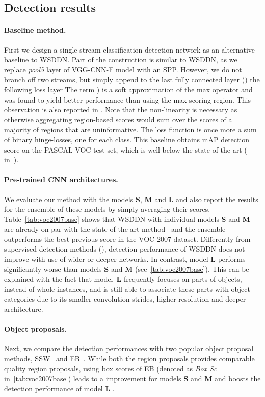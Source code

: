 \documentclass[10pt,twocolumn,letterpaper]{article}
\begin{document}
\subsection{Detection results}\label{s:detres}


\paragraph{Baseline method.} First we design a single stream classification-detection network as an alternative baseline to WSDDN. Part of the construction is similar to WSDDN, as we replace \textit{pool5} layer of VGG-CNN-F model with an SPP. However, we do not branch off two streams, but simply append to the last fully connected layer () the following loss layer 
The term ) is a soft approximation of the max operator  and was found to yield better performance than using the max scoring region. This observation is also reported in \cite{Bilen14}. Note that the non-linearity is necessary as otherwise aggregating region-based scores would sum over the scores of a majority of regions that are uninformative. The loss function is once more a sum of  binary hinge-losses, one for each class. This baseline obtains  mAP detection score on the PASCAL VOC test set, which is well below the state-of-the-art ( in~\cite{Wang14a}).

\paragraph{Pre-trained CNN architectures.} We evaluate our method with the models \textbf{S}, \textbf{M} and \textbf{L} and also report the results for the ensemble of these models by simply averaging their scores. Table~\ref{tab:voc2007base} shows that WSDDN with individual models \textbf{S} and \textbf{M} are already on par with the state-of-the-art method~\cite{Wang14a} and the ensemble outperforms the best previous score in the VOC 2007 dataset. Differently from supervised detection methods (\eg \cite{Girshick15}), detection performance of WSDDN does not improve with use of wider or deeper networks. In contrast, model \textbf{L} performs significantly worse than models \textbf{S} and \textbf{M} (see~\cref{tab:voc2007base}). This can be explained with the fact that model~\textbf{L} frequently focuses on parts of objects, instead of whole instances, and is still able to associate these parts with object categories due to its smaller convolution strides, higher resolution and deeper architecture.

\paragraph{Object proposals.} Next, we compare the detection performances with two popular object proposal methods, SSW~\cite{Sande11} and EB~\cite{Zitnick14}. While both the region proposals provides comparable quality region proposals, using box scores of EB (denoted as \emph{Box Sc} in~\cref{tab:voc2007base}) leads to a  improvement for models \textbf{S} and \textbf{M} and boosts the detection performance of model \textbf{L} .
\end{document}
